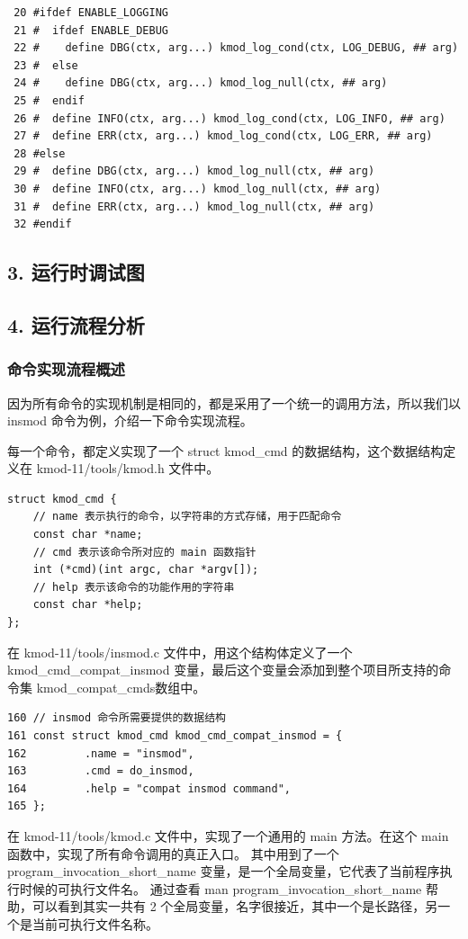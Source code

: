 \documentclass[11pt,a4paper]{article}
\begin{document}
{\begin{shaded}\begin{verbatim}
 20 #ifdef ENABLE_LOGGING
 21 #  ifdef ENABLE_DEBUG
 22 #    define DBG(ctx, arg...) kmod_log_cond(ctx, LOG_DEBUG, ## arg)
 23 #  else
 24 #    define DBG(ctx, arg...) kmod_log_null(ctx, ## arg)
 25 #  endif
 26 #  define INFO(ctx, arg...) kmod_log_cond(ctx, LOG_INFO, ## arg)
 27 #  define ERR(ctx, arg...) kmod_log_cond(ctx, LOG_ERR, ## arg)
 28 #else
 29 #  define DBG(ctx, arg...) kmod_log_null(ctx, ## arg)
 30 #  define INFO(ctx, arg...) kmod_log_null(ctx, ## arg)
 31 #  define ERR(ctx, arg...) kmod_log_null(ctx, ## arg)
 32 #endif
\end{verbatim}\end{shaded}}
\subsection{3. 运行时调试图}

\subsection{4. 运行流程分析}

\subsubsection{命令实现流程概述}

因为所有命令的实现机制是相同的，都是采用了一个统一的调用方法，所以我们以
insmod 命令为例，介绍一下命令实现流程。

每一个命令，都定义实现了一个 struct kmod\_cmd
的数据结构，这个数据结构定义在 kmod-11/tools/kmod.h 文件中。

{\begin{shaded}\begin{verbatim}
struct kmod_cmd {
    // name 表示执行的命令，以字符串的方式存储，用于匹配命令
    const char *name;
    // cmd 表示该命令所对应的 main 函数指针
    int (*cmd)(int argc, char *argv[]);
    // help 表示该命令的功能作用的字符串
    const char *help;
};
\end{verbatim}\end{shaded}}
在 kmod-11/tools/insmod.c 文件中，用这个结构体定义了一个
kmod\_cmd\_compat\_insmod
变量，最后这个变量会添加到整个项目所支持的命令集
kmod\_compat\_cmds数组中。

{\begin{shaded}\begin{verbatim}
160 // insmod 命令所需要提供的数据结构
161 const struct kmod_cmd kmod_cmd_compat_insmod = {
162         .name = "insmod",
163         .cmd = do_insmod,
164         .help = "compat insmod command",
165 };
\end{verbatim}\end{shaded}}
在 kmod-11/tools/kmod.c 文件中，实现了一个通用的 main 方法。在这个 main
函数中，实现了所有命令调用的真正入口。 其中用到了一个
program\_invocation\_short\_name
变量，是一个全局变量，它代表了当前程序执行时候的可执行文件名。 通过查看
man program\_invocation\_short\_name 帮助，可以看到其实一共有 2
个全局变量，名字很接近，其中一个是长路径，另一个是当前可执行文件名称。
\end{document}
